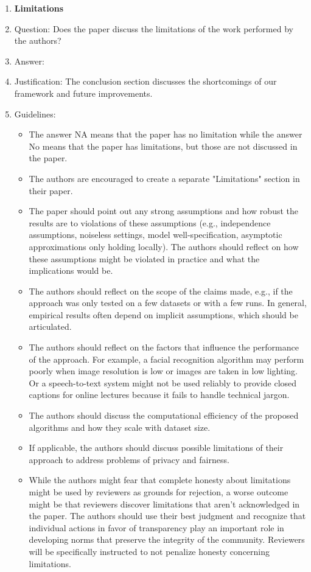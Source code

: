 \documentclass{article}
\begin{document}
\begin{enumerate}
\item {\bf Limitations}
    \item[] Question: Does the paper discuss the limitations of the work performed by the authors?
    \item[] Answer: \answerYes{} %
    \item[] Justification: The conclusion section discusses the shortcomings of our framework and future improvements.
    \item[] Guidelines:
    \begin{itemize}
        \item The answer NA means that the paper has no limitation while the answer No means that the paper has limitations, but those are not discussed in the paper. 
        \item The authors are encouraged to create a separate "Limitations" section in their paper.
        \item The paper should point out any strong assumptions and how robust the results are to violations of these assumptions (e.g., independence assumptions, noiseless settings, model well-specification, asymptotic approximations only holding locally). The authors should reflect on how these assumptions might be violated in practice and what the implications would be.
        \item The authors should reflect on the scope of the claims made, e.g., if the approach was only tested on a few datasets or with a few runs. In general, empirical results often depend on implicit assumptions, which should be articulated.
        \item The authors should reflect on the factors that influence the performance of the approach. For example, a facial recognition algorithm may perform poorly when image resolution is low or images are taken in low lighting. Or a speech-to-text system might not be used reliably to provide closed captions for online lectures because it fails to handle technical jargon.
        \item The authors should discuss the computational efficiency of the proposed algorithms and how they scale with dataset size.
        \item If applicable, the authors should discuss possible limitations of their approach to address problems of privacy and fairness.
        \item While the authors might fear that complete honesty about limitations might be used by reviewers as grounds for rejection, a worse outcome might be that reviewers discover limitations that aren't acknowledged in the paper. The authors should use their best judgment and recognize that individual actions in favor of transparency play an important role in developing norms that preserve the integrity of the community. Reviewers will be specifically instructed to not penalize honesty concerning limitations.
    \end{itemize}


\end{enumerate}
\end{document}

